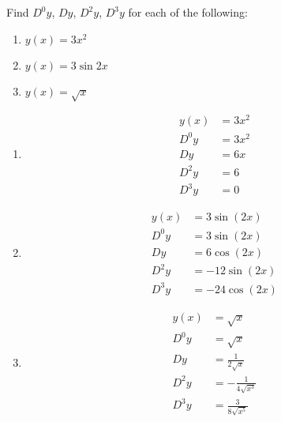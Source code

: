 \begin{exercise}
	Find $D^0y$, $Dy$, $D^2y$, $D^3y$ for each of the following:
	\renewcommand{\labelenumi}{(\alph{enumi})}
	\begin{enumerate}
		\item $y\left(x\right) = 3x^2$
		\item $y\left(x\right) = 3 \sin 2x$
		\item $y\left(x\right) = \sqrt{x}$
	\end{enumerate}
\end{exercise}
\begin{solution}
	{\color{white}{content...}}
	\renewcommand{\labelenumi}{(\alph{enumi})}
	\begin{enumerate}
		\item \begin{align*}
		y\left(x\right) &= 3x^2 \\
		D^0y &= 3x^2 \\
		Dy &= 6x \\
		D^2y &= 6 \\
		D^3y &= 0
		\end{align*}
		\item \begin{align*}
		y\left(x\right) &= 3 \sin \left( 2x \right) \\
		D^0y &= 3 \sin \left( 2x \right) \\
		Dy &= 6 \cos \left( 2x \right) \\
		D^2y &= -12 \sin \left( 2x \right) \\
		D^3y &= -24 \cos \left( 2x \right)
		\end{align*}
		\item \begin{align*}
		y\left(x\right) &= \sqrt{x} \\
		D^0y &= \sqrt{x} \\
		Dy &= \frac{1}{2\sqrt{x}} \\
		D^2y &= -\frac{1}{4\sqrt{x^3}} \\
		D^3y &= \frac{3}{8\sqrt{x^5}}
		\end{align*}
	\end{enumerate}
\end{solution}
